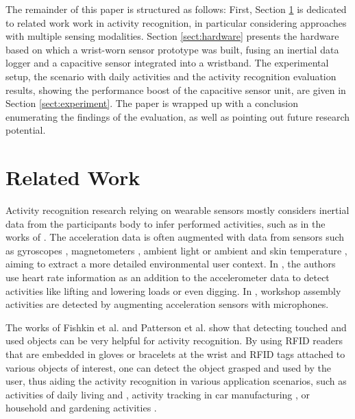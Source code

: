 \documentclass[runningheads,a4paper]{llncs}
\begin{document}
The remainder of this paper is structured as follows: First, Section \ref{sect:related} is dedicated to related work work in activity recognition, in particular considering approaches with multiple sensing modalities. Section \ref{sect:hardware} presents the hardware based on which a wrist-worn sensor prototype was built, fusing an inertial data logger and a capacitive sensor integrated into a wristband.
The experimental setup, the scenario with daily activities and the activity recognition evaluation results, showing the performance boost of the capacitive sensor unit, are given in Section \ref{sect:experiment}. The paper is wrapped up with a conclusion enumerating the findings of the evaluation, as well as pointing out future research potential.

\section{Related Work}
\label{sect:related}

Activity recognition research relying on wearable sensors mostly considers inertial data from the participants body to infer performed activities, such as in the works of \cite{Ravi2005,Bao2004,Srinivasan2010,Amft2005}. The acceleration data is often augmented with data from sensors such as gyroscopes \cite{Holleczek_2010}, magnetometers \cite{Altun_2010}, ambient light \cite{Borazio2012} or ambient and skin temperature \cite{Krause_2003}, aiming to extract a more detailed environmental user context. In \cite{wyss2010recognition}, the authors use heart rate information as an addition to the accelerometer data to detect activities like lifting and lowering loads or even digging. In \cite{Ward_2006}, workshop assembly activities are detected by augmenting acceleration sensors with microphones.

The works of Fishkin et al. \cite{Fishkin_2005} and Patterson et al. \cite{patterson2005fga} show that detecting touched and used objects can be very helpful for activity recognition. By using RFID readers that are embedded in gloves or bracelets at the wrist and RFID tags attached to various objects of interest, one can detect the object grasped and used by the user, thus aiding the activity recognition in various application scenarios, such as activities of daily living \cite{phealth:maja} and \cite{Philipose_2004}, activity tracking in car manufacturing \cite{Stiefmeier08}, or household and gardening activities \cite{berlin_laerhoven_tei_2010}. 
\end{document}

